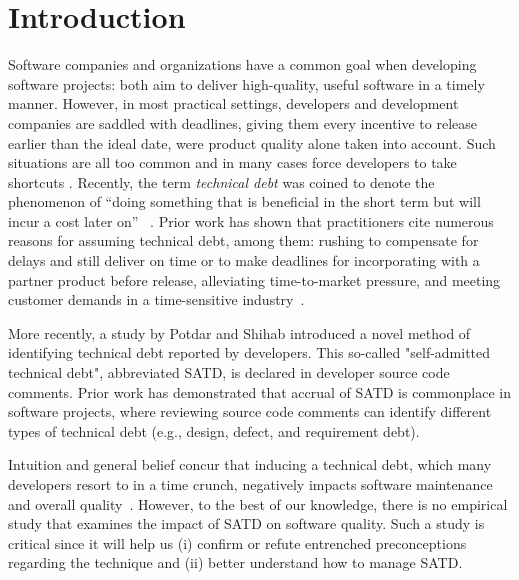 
\section{Introduction}
\label{chap3:sec:introduction}
Software companies and organizations have a common goal when developing software projects: both aim to deliver high-quality, useful software in a timely manner. However, in most practical settings, developers and development companies are saddled with deadlines, giving them every incentive to release earlier than the ideal date, were product quality alone taken into account. Such situations are all too common and in many cases force developers to take shortcuts \cite{kruchten2013technical} \cite{seaman2015technical}. Recently, the term \emph{technical debt} was coined to denote the phenomenon of ``doing something that is beneficial in the short term but will incur a cost later on''~ \cite{cunningham1993wycash}. Prior work has shown that practitioners cite numerous reasons for assuming technical debt, among them: rushing to compensate for delays and still deliver on time or to make deadlines for incorporating with a partner product before release, alleviating time-to-market pressure, and meeting customer demands in a time-sensitive industry~\cite{lim2012balancing}.


More recently, a study by Potdar and Shihab \cite{ICSM_PotdarS14} introduced a novel method of identifying technical debt reported by developers. This so-called "self-admitted technical debt", abbreviated SATD, is declared in developer source code comments. Prior work \cite{MTD15p9} has demonstrated that accrual of SATD is commonplace in software projects, where reviewing source code comments can identify different types of technical debt (e.g., design, defect, and requirement debt).

Intuition and general belief concur that inducing a technical debt, which many developers resort to in a time crunch, negatively impacts software maintenance and overall quality~\cite{zazworka2011investigating,spinola2013investigating,GuoSGCTSSS11,seaman2015technical,kruchten2013technical}. However, to the best of our knowledge, there is no empirical study that examines the impact of SATD on software quality. Such a study is critical since it will help us (i) confirm or refute entrenched preconceptions regarding the technique and (ii) better understand how to manage SATD.


